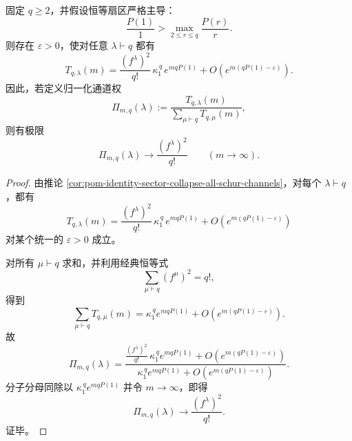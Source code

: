 \begin{theorem}\label{thm:xi-time-part63c-identity-sector-schur-plancherel-limit}
固定 \(q\ge 2\)，并假设恒等扇区严格主导：
\[
\frac{P(1)}{1}>\max_{2\le r\le q}\frac{P(r)}{r}.
\]
则存在 \(\varepsilon>0\)，使对任意 \(\lambda\vdash q\) 都有
\[
T_{q,\lambda}(m)
=
\frac{(f^\lambda)^2}{q!}\,\kappa_1^{\,q}\,e^{mqP(1)}
+O\!\left(e^{m(qP(1)-\varepsilon)}\right).
\]
因此，若定义归一化通道权
\[
\Pi_{m,q}(\lambda):=
\frac{T_{q,\lambda}(m)}{\sum_{\mu\vdash q}T_{q,\mu}(m)},
\]
则有极限
\[
\boxed{\;
\Pi_{m,q}(\lambda)\longrightarrow \frac{(f^\lambda)^2}{q!}
\qquad(m\to\infty).\;}
\]
\end{theorem}
\begin{proof}
由推论 \ref{cor:pom-identity-sector-collapse-all-schur-channels}，对每个 \(\lambda\vdash q\)，都有
\[
T_{q,\lambda}(m)
=
\frac{(f^\lambda)^2}{q!}\,\kappa_1^{\,q}\,e^{mqP(1)}
+O\!\left(e^{m(qP(1)-\varepsilon)}\right)
\]
对某个统一的 \(\varepsilon>0\) 成立。

对所有 \(\mu\vdash q\) 求和，并利用经典恒等式
\[
\sum_{\mu\vdash q}(f^\mu)^2=q!,
\]
得到
\[
\sum_{\mu\vdash q}T_{q,\mu}(m)
=
\kappa_1^{\,q}e^{mqP(1)}
+O\!\left(e^{m(qP(1)-\varepsilon)}\right).
\]
故
\[
\Pi_{m,q}(\lambda)
=
\frac{\frac{(f^\lambda)^2}{q!}\,\kappa_1^{\,q}e^{mqP(1)}+O(e^{m(qP(1)-\varepsilon)})}
{\kappa_1^{\,q}e^{mqP(1)}+O(e^{m(qP(1)-\varepsilon)})}.
\]
分子分母同除以 \(\kappa_1^{\,q}e^{mqP(1)}\) 并令 \(m\to\infty\)，即得
\[
\Pi_{m,q}(\lambda)\to \frac{(f^\lambda)^2}{q!}.
\]
证毕。
\end{proof}

